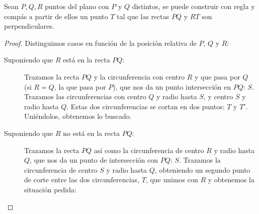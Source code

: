 \begin{lema}
    Sean $P,Q,R$ puntos del plano con $P$ y $Q$ distintos, se puede construir con regla y compás a partir de ellos un punto $T$  tal que las rectas $PQ$ y $RT$ son perpendiculares.
    \begin{proof}
        Distinguimos casos en función de la posición relativa de $P$, $Q$ y $R$:
        \begin{description}
            \item [Suponiendo que $R$ está en la recta $PQ$:] Trazamos la recta $PQ$ y la circunferencia con centro $R$ y que pasa por $Q$ (si $R=Q$, la que pasa por $P$), que nos da un punto intersección en $PQ$: $S$. Trazamos las circunferencias con centro $Q$ y radio hasta $S$, y centro $S$ y radio hasta $Q$. Estas dos circunferencias se cortan en dos puntos: $T$ y $T'$. Uniéndolos, obtenemos lo buscado.
            \begin{figure}[H]
                \centering
            \end{figure}
            \item [Suponiendo que $R$ no está en la recta $PQ$:]
                Trazamos la recta $PQ$ así como la circunferencia de centro $R$ y radio hasta $Q$, que nos da un punto de intersección con $PQ$: $S$. Trazamos la circunferencia de centro $S$ y radio hasta $Q$, obteniendo un segundo punto de corte entre las dos circunferencias, $T$, que unimos con $R$ y obtenemos la situación pedida:
            \begin{figure}[H]
                \centering
\end{figure}
\end{description}
\end{proof}
\end{lema}
